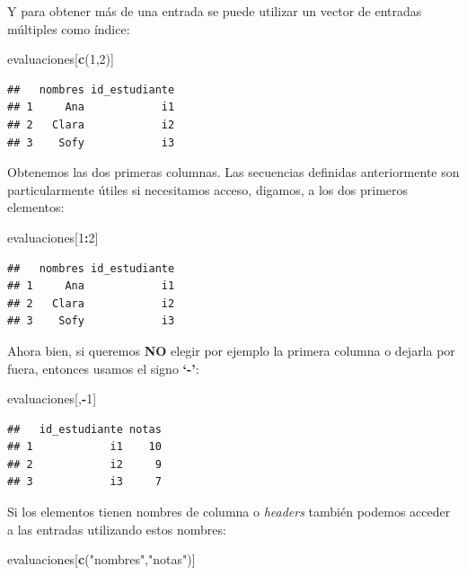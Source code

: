 \documentclass[
]{book}
\newenvironment{Shaded}{\begin{snugshade}}{\end{snugshade}}
\newcommand{\DecValTok}[1]{\textcolor[rgb]{0.00,0.00,0.81}{#1}}
\newcommand{\FunctionTok}[1]{\textcolor[rgb]{0.13,0.29,0.53}{\textbf{#1}}}
\newcommand{\NormalTok}[1]{#1}
\newcommand{\SpecialCharTok}[1]{\textcolor[rgb]{0.81,0.36,0.00}{\textbf{#1}}}
\newcommand{\StringTok}[1]{\textcolor[rgb]{0.31,0.60,0.02}{#1}}
\begin{document}
Y para obtener más de una entrada se puede utilizar un vector de entradas múltiples como índice:

\begin{Shaded}
\begin{Highlighting}[]
\NormalTok{evaluaciones[}\FunctionTok{c}\NormalTok{(}\DecValTok{1}\NormalTok{,}\DecValTok{2}\NormalTok{)]}
\end{Highlighting}
\end{Shaded}

\begin{verbatim}
##   nombres id_estudiante
## 1     Ana            i1
## 2   Clara            i2
## 3    Sofy            i3
\end{verbatim}

Obtenemos las dos primeras columnas.
Las secuencias definidas anteriormente son particularmente útiles si necesitamos acceso, digamos, a los dos primeros elementos:

\begin{Shaded}
\begin{Highlighting}[]
\NormalTok{evaluaciones[}\DecValTok{1}\SpecialCharTok{:}\DecValTok{2}\NormalTok{]}
\end{Highlighting}
\end{Shaded}

\begin{verbatim}
##   nombres id_estudiante
## 1     Ana            i1
## 2   Clara            i2
## 3    Sofy            i3
\end{verbatim}

Ahora bien, si queremos \textbf{NO} elegir por ejemplo la primera columna o dejarla por fuera, entonces usamos el signo \textbf{`-'}:

\begin{Shaded}
\begin{Highlighting}[]
\NormalTok{evaluaciones[,}\SpecialCharTok{{-}}\DecValTok{1}\NormalTok{]}
\end{Highlighting}
\end{Shaded}

\begin{verbatim}
##   id_estudiante notas
## 1            i1    10
## 2            i2     9
## 3            i3     7
\end{verbatim}

Si los elementos tienen nombres de columna o \emph{headers} también podemos acceder a las entradas utilizando estos nombres:

\begin{Shaded}
\begin{Highlighting}[]
\NormalTok{evaluaciones[}\FunctionTok{c}\NormalTok{(}\StringTok{"nombres"}\NormalTok{,}\StringTok{"notas"}\NormalTok{)]}
\end{Highlighting}
\end{Shaded}
\end{document}
